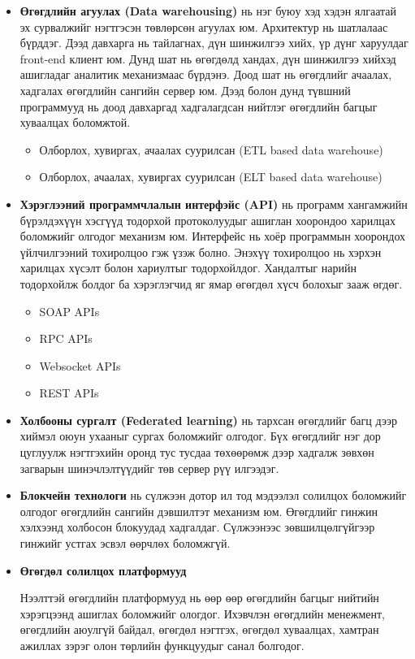\begin{itemize}
    \item \textbf{Өгөгдлийн агуулах (Data warehousing)} нь нэг буюу хэд хэдэн ялгаатай эх сурвалжийг нэгтгэсэн төвлөрсөн агуулах юм. Архитектур нь шатлалаас бүрддэг. Дээд давхарга нь тайлагнах, дүн шинжилгээ хийх, үр дүнг харуулдаг front-end клиент юм. Дунд шат нь өгөгдөлд хандах, дүн шинжилгээ хийхэд ашигладаг аналитик механизмаас бүрдэнэ. Доод шат нь өгөгдлийг ачаалах, хадгалах өгөгдлийн сангийн сервер юм. Дээд болон дунд түвшний программууд нь доод давхаргад хадгалагдсан нийтлэг өгөгдлийн багцыг хуваалцах боломжтой.
    \begin{itemize}
        \item Олборлох, хувиргах, ачаалах суурилсан (ETL based data warehouse)
        \item Олборлох, ачаалах, хувиргах суурилсан (ELT based data warehouse)
    \end{itemize}

    \item \textbf{Хэрэглээний программчлалын интерфэйс (API)} нь программ хангамжийн бүрэлдэхүүн хэсгүүд тодорхой протоколуудыг ашиглан хоорондоо харилцах боломжийг олгодог механизм юм. Интерфейс нь хоёр программын хоорондох үйлчилгээний тохиролцоо гэж үзэж болно. Энэхүү тохиролцоо нь хэрхэн харилцах хүсэлт болон хариултыг тодорхойлдог. Хандалтыг нарийн тодорхойлж болдог ба хэрэглэгчид яг ямар өгөгдөл хүсч болохыг зааж өгдөг.
    \begin{itemize}
        \item SOAP APIs 
        \item RPC APIs
        \item Websocket APIs
        \item REST APIs
    \end{itemize}
    
    \item \textbf{Холбооны сургалт (Federated learning)} нь тархсан өгөгдлийг багц дээр хиймэл оюун ухааныг сургах боломжийг олгодог. Бүх өгөгдлийг нэг дор цуглуулж нэгтгэхийн оронд тус тусдаа төхөөрөмж дээр хадгалж зөвхөн загварын шинэчлэлтүүдийг төв сервер рүү илгээдэг.

    \item \textbf{Блокчейн технологи} нь сүлжээн дотор ил тод мэдээлэл солилцох боломжийг олгодог өгөгдлийн сангийн дэвшилтэт механизм юм. Өгөгдлийг гинжин хэлхээнд холбосон блокуудад хадгалдаг. Сүлжээнээс зөвшилцөлгүйгээр гинжийг устгах эсвэл өөрчлөх боломжгүй.

    \item \textbf{Өгөгдөл солилцох платформууд}
    
    Нээлттэй өгөгдлийн платформууд нь өөр өөр өгөгдлийн багцыг нийтийн хэрэгцээнд ашиглах боломжийг ологдог. Ихэвчлэн өгөгдлийн менежмент, өгөгдлийн аюулгүй байдал, өгөгдөл нэгтгэх, өгөгдөл хуваалцах, хамтран ажиллах зэрэг олон төрлийн функцуудыг санал болгодог.


\end{itemize}

